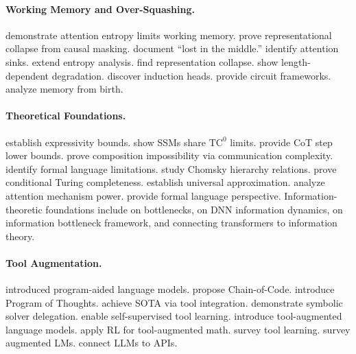 \documentclass{article}
\theoremstyle{plain}
\theoremstyle{definition}
\theoremstyle{remark}
\begin{document}
\paragraph{Working Memory and Over-Squashing.} \citet{gong2024attention} demonstrate attention entropy limits working memory. \citet{barbero2024oversquash} prove representational collapse from causal masking. \citet{liu2023lost} document ``lost in the middle.'' \citet{xiao2024efficient} identify attention sinks. \citet{zhang2024attention} extend entropy analysis. \citet{gerasimov2025fullyutilizetransformersrepresentation} find representation collapse. \citet{levy2024same} show length-dependent degradation. \citet{olsson2022context} discover induction heads. \citet{elhage2021mathematical} provide circuit frameworks. \citet{bietti2024birth} analyze memory from birth.

\paragraph{Theoretical Foundations.} \citet{merrill2024expressive} establish expressivity bounds. \citet{merrill2024illusion} show SSMs share $\text{TC}^0$ limits. \citet{bavandpour2025lower} provide CoT step lower bounds. \citet{peng2024limitations} prove composition impossibility via communication complexity. \citet{hahn2020theoretical} identify formal language limitations. \citet{deletang2023chomsky} study Chomsky hierarchy relations. \citet{perez2021turing} prove conditional Turing completeness. \citet{yun2020universal} establish universal approximation. \citet{bhattamishra2020computational} analyze attention mechanism power. \citet{strobl2024formal} provide formal language perspective. Information-theoretic foundations include \citet{tishby2015information} on bottlenecks, \citet{shwartzziv2017opening} on DNN information dynamics, \citet{goldfeld2020information} on information bottleneck framework, and \citet{kirsch2024general} connecting transformers to information theory.

\paragraph{Tool Augmentation.} \citet{gao2023pal} introduced program-aided language models. \citet{li2023chaincode} propose Chain-of-Code. \citet{chen2023program} introduce Program of Thoughts. \citet{gou2024tora} achieve SOTA via tool integration. \citet{pan2024logiclm} demonstrate symbolic solver delegation. \citet{schick2023toolformer} enable self-supervised tool learning. \citet{parisi2022talm} introduce tool-augmented language models. \citet{luo2026agentmath} apply RL for tool-augmented math. \citet{qin2024tool} survey tool learning. \citet{mialon2023augmented} survey augmented LMs. \citet{patil2023gorilla} connect LLMs to APIs.
\end{document}
